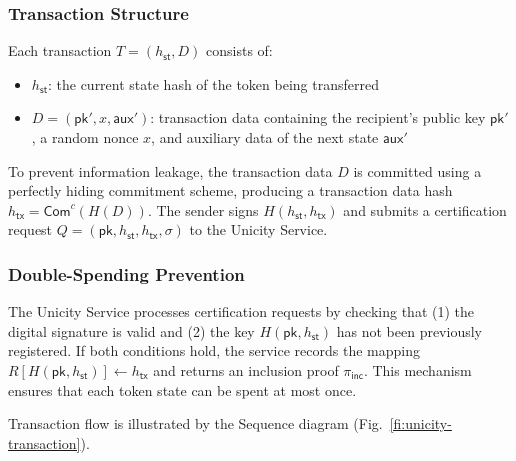 \documentclass{article}
\newcommand{\pubkey}[0]{\mathsf{pk}}
\newcommand{\commitc}[0]{\mathsf{Com}^{c}}
\newcommand{\sthash}[0]{h_\mathsf{st}}
\newcommand{\txhash}[0]{h_\mathsf{tx}}
\newcommand{\auxd}[0]{\mathsf{aux}}
\newcommand{\pinc}[0]{\pi_{\mathsf{inc}}}
\begin{document}
\subsubsection{Transaction Structure}

Each transaction $T = (\sthash, D)$ consists of:
\begin{itemize}
\item $\sthash$: the current state hash of the token being transferred
\item $D = (\pubkey', x, \auxd')$: transaction data containing the recipient's public key $\pubkey'$, a random nonce $x$, and auxiliary data of the next state $\auxd'$
\end{itemize}

\noindent To prevent information leakage, the transaction data $D$ is committed using a perfectly hiding commitment scheme, producing a transaction data hash $\txhash = \commitc(H(D))$. The sender signs $H(\sthash, \txhash)$ and submits a certification request $Q = (\pubkey, \sthash, \txhash, \sigma)$ to the Unicity Service.

\subsubsection{Double-Spending Prevention}

The Unicity Service processes certification requests by checking that (1) the digital signature is valid and (2) the key $H(\pubkey, \sthash)$ has not been previously registered. If both conditions hold, the service records the mapping $R[H(\pubkey, \sthash)] \gets \txhash$ and returns an inclusion proof $\pinc$. This mechanism ensures that each token state can be spent at most once.

Transaction flow is illustrated by the Sequence diagram (Fig.~\ref{fi:unicity-transaction}).
\end{document}
